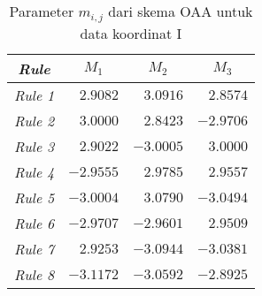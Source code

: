 \setcounter{table}{0}

 \label{lam: dk1 OAA}
\footnotesize{
\begin{table}[htbp!]
    \centering
    \caption{Parameter $m_{i,j}$ dari skema OAA untuk data koordinat I}
    \label{tab: lam dk1 OAA M}
    \begin{tabular}{crrr}
    \toprule
    \textit{\textbf{Rule}} & \multicolumn{1}{c}{\boldmath{}\textbf{$M_1$}\unboldmath{}} & \multicolumn{1}{c}{\boldmath{}\textbf{$M_2$}\unboldmath{}} & \multicolumn{1}{c}{\boldmath{}\textbf{$M_3$}\unboldmath{}} \\
    \midrule
    \textit{Rule 1} & $\num{2,9082}$ & $\num{3,0916}$ & $\num{2,8574}$ \\
    \textit{Rule 2} & $\num{3,0000}$ & $\num{2,8423}$ & $\num{-2,9706}$ \\
    \textit{Rule 3}& $\num{2,9022}$ & $\num{-3,0005}$ & $\num{3,0000}$ \\
    \textit{Rule 4} & $\num{-2,9555}$ & $\num{2,9785}$ & $\num{2,9557}$ \\
    \textit{Rule 5} & $\num{-3,0004}$ & $\num{3,0790}$ & $\num{-3,0494}$ \\
    \textit{Rule 6} & $\num{-2,9707}$ & $\num{-2,9601}$ & $\num{2,9509}$ \\
    \textit{Rule 7} & $\num{2,9253}$ & $\num{-3,0944}$ & $\num{-3,0381}$ \\
    \textit{Rule 8} & $\num{-3,1172}$ & $\num{-3,0592}$ & $\num{-2,8925}$ \\
    \bottomrule
    \end{tabular}%
\end{table}

}
